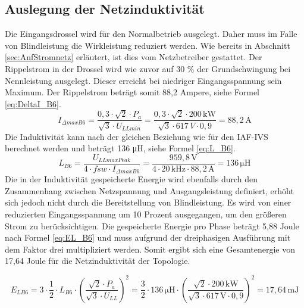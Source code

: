 		\subsection{Auslegung der Netzinduktivität}
				Die Eingangsdrossel wird für den Normalbetrieb ausgelegt. Daher muss im Falle von Blindleistung die Wirkleistung reduziert werden. Wie bereits in Abschnitt \ref{sec:AnfStromnetz} erläutert, ist dies vom Netzbetreiber gestattet. Der Rippelstrom in der Drossel wird wie zuvor auf 30 \% der Grundschwingung bei Nennleistung ausgelegt. Dieser erreicht bei niedriger Eingangsspannung sein Maximum. Der Rippelstrom beträgt somit 88,2 Ampere, siehe Formel \ref{eq:DeltaI_B6}.\\
			
			\begin{equation}
				\label{eq:DeltaI_B6}
				I_{\Delta max B6}= \dfrac{0,3 \cdot \sqrt{2} \cdot P_{a}}{\sqrt{3}\cdot U_{LLmin}}= \dfrac{0,3\cdot \sqrt{2} \cdot 200\, \si{\kilo \watt}}{\sqrt{3} \cdot 617\, \si{V} \cdot 0,9} = 88,2\, \si{\A}
			\end{equation}
			Die Induktivität kann nach der gleichen Beziehung wie für den \gls{IAF}-\gls{IVS} berechnet werden und beträgt 136 \si{\micro \henry}, siehe Formel \ref{eq:L_B6}.
			\begin{equation}
				\label{eq:L_B6}
				L_{B6}= \dfrac{U_{LLmaxPeak}}{4\cdot f{sw} \cdot I_{\Delta max B6}} = \dfrac{959,8\, \si{\volt}}{4 \cdot 20\, \si{\kilo \hertz} \cdot 88,2\, \si{\ampere}} =136\, \si{\micro \henry}
			\end{equation}
			Die in der Induktivität gespeicherte Energie wird ebenfalls durch den Zusammenhang zwischen Netzspannung und Ausgangsleistung definiert, erhöht sich jedoch nicht durch die Bereitstellung von Blindleistung. Es wird von einer reduzierten Eingangsspannung um 10 Prozent ausgegangen, um den größeren Strom zu berücksichtigen. Die gespeicherte Energie pro Phase beträgt 5,88 Joule nach Formel \ref{eq:EL_B6} und muss aufgrund der dreiphasigen Ausführung mit dem Faktor drei multipliziert werden. Somit ergibt sich eine Gesamtenergie von 17,64 Joule für die Netzinduktivität der Topologie. 
			
			\begin{equation}
			\label{eq:EL_B6}
			E_{LB6}= 3 \cdot \dfrac{1}{2} \cdot L_{B6} \cdot (\dfrac{\sqrt{2} \cdot P_{a}}{\sqrt{3}\cdot U_{LL}})^{2}= \dfrac{3}{2} \cdot 136 \,\si{\micro \henry} \cdot ({\dfrac{\sqrt{2} \cdot 200\, \si{\kilo \watt} }{\sqrt{3} \cdot 617\, \si{\volt} \cdot 0,9}})^{2} = 17,64 \, \si{\milli \joule}
			\end{equation}
			
